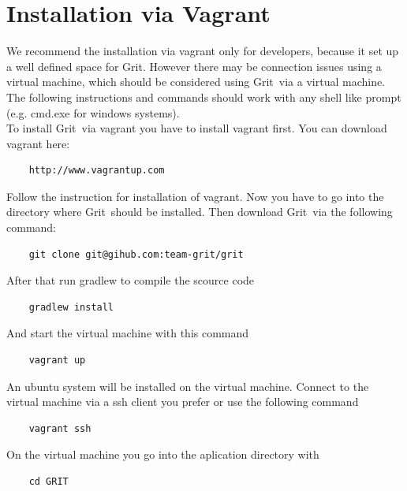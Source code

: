 \documentclass[10pt,a4paper, titlepage, toc=idx]{scrreprt}
\theoremstyle{definition}
\theoremstyle{plain}
\newcommand*{\product}{Grit}
\begin{document}
\section{Installation via Vagrant}\label{3.4}
We recommend the installation via vagrant only for developers, because it set up a well defined space for \product. However there may be connection issues using a virtual machine, which should be considered using \product\ via a virtual machine.\\

\noindent The following instructions and commands should work with any shell like prompt (e.g. cmd.exe for windows systems).\\

\noindent To install \product\ via vagrant you have to install vagrant first. You can download vagrant here:
\begin{lstlisting}
	http://www.vagrantup.com
\end{lstlisting}
Follow the instruction for installation of vagrant. Now you have to go into the directory where \product\ should be installed. Then download \product\ via the following command: 
\begin{lstlisting}
	git clone git@gihub.com:team-grit/grit
\end{lstlisting}
After that run gradlew to compile the scource code
\begin{lstlisting}
	gradlew install
\end{lstlisting}
And start the virtual machine with this command
\begin{lstlisting}
	vagrant up
\end{lstlisting}
An ubuntu system will be installed on the virtual machine. Connect to the virtual machine via a ssh client you prefer or use the following command
\begin{lstlisting}
	vagrant ssh
\end{lstlisting}

\noindent On the virtual machine you go into the aplication directory with 
\begin{lstlisting}
	cd GRIT
\end{lstlisting}

\end{document}
